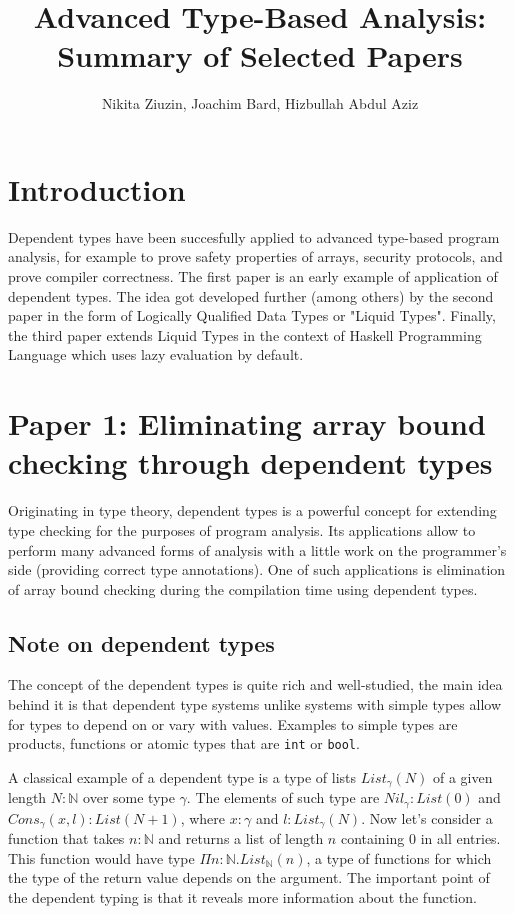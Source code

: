 \documentclass[a4paper,UKenglish]{lipics-v2016}
\title{Advanced Type-Based Analysis: Summary of Selected Papers}
\author[1]{Nikita Ziuzin, Joachim Bard, Hizbullah Abdul Aziz}
\affil[1]{\texttt{nzyuzin93@gmail.com}, \texttt{s9jobard@stud.uni-saarland.de}, \texttt{s8hijabb@stud.uni-saarland.de}}
\begin{document}
\maketitle


\section{Introduction}
Dependent types have been succesfully applied to advanced type-based program
analysis, for example to prove safety properties of arrays, security protocols,
and prove compiler correctness.  The first paper is an early example of
application of dependent types.  The idea got developed further (among others)
by the second paper in the form of Logically Qualified Data Types or "Liquid
Types".  Finally, the third paper extends Liquid Types in the context of
Haskell Programming Language which uses lazy evaluation by default.



\section{Paper 1: Eliminating array bound checking through dependent types}

\abstract

Originating in type theory, dependent types is a powerful concept for extending
type checking for the purposes of program analysis. Its applications allow to
perform many advanced forms of analysis with a little work on the programmer's
side (providing correct type annotations). One of such applications is
elimination of array bound checking during the compilation time using dependent
types.

\subsection{Note on dependent types}

The concept of the dependent types is quite rich and well-studied, the main
idea behind it is that dependent type systems unlike systems with simple types
allow for types to depend on or vary with values. Examples to simple types are
products, functions or atomic types that are \texttt{int} or \texttt{bool}.

A classical example of a dependent type is a type of lists $List_\gamma(N)$ of
a given length $N : \mathbb{N}$ over some type $\gamma$. The elements of such
type are $Nil_\gamma : List(0)$ and $Cons_\gamma(x, l) : List(N+1)$, where $x :
\gamma$ and $l : List_\gamma(N)$. Now let's consider a function that takes $n :
\mathbb{N}$ and returns a list of length $n$ containing $0$ in all entries.
This function would have type $\Pi n : \mathbb{N}.List_\mathbb{N}(n)$, a type
of functions for which the type of the return value depends on the argument.
The important point of the dependent typing is that it reveals more information
about the function.
\end{document}

